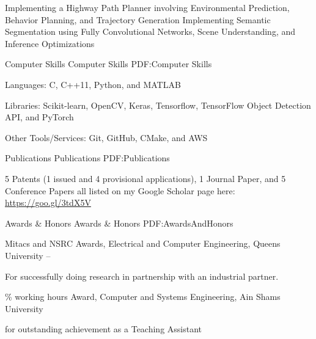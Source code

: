 \documentclass[letterpaper,MMMyyyy,nonstopmode]{simpleresumecv}
\newcommand{\CVNote}{CV compiled on {\today} for Udacity 2018}
\begin{document}
\begin{Body}
\BulletItem
Implementing a Highway Path Planner involving Environmental Prediction, Behavior Planning, and Trajectory Generation
\BulletItem
Implementing Semantic Segmentation using Fully Convolutional Networks, Scene Understanding, and Inference Optimizations



\Section
{Computer \newline
Skills}
{Computer Skills}
{PDF:Computer Skills}

\Entry
Languages: C, C++11, Python, and MATLAB

\Entry
Libraries: Scikit-learn, OpenCV, Keras, Tensorflow, TensorFlow Object Detection API, and PyTorch

\Entry
Other Tools/Services: Git, GitHub, CMake, and AWS


\Section
{Publications}
{Publications}
{PDF:Publications}

5 Patents (1 issued and 4 provisional applications), 1 Journal Paper, and 5 Conference Papers all listed on my Google Scholar page here: \href{https://goo.gl/3tdX5V}{https://goo.gl/3tdX5V}


\Section
{Awards \&\newline
Honors}
{Awards \& Honors}
{PDF:AwardsAndHonors}

\BulletItem
Mitacs and NSRC Awards, Electrical and Computer Engineering, Queens University 
\hfill
{} --
\begin{Detail}
\Item
For successfully doing research in partnership with an industrial partner.
\end{Detail}

\Gap
{}\% working hours Award, Computer and Systems Engineering, Ain Shams University
\hfill
{}
\begin{Detail}
\Item
for outstanding achievement as a Teaching Assistant
\end{Detail}

\end{Body}


\end{document}
